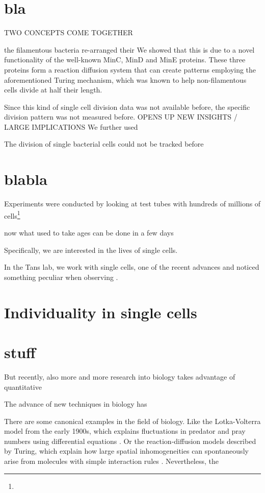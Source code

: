 \section{bla}

TWO CONCEPTS COME TOGETHER

the filamentous bacteria re-arranged their 
%
We showed that this is due to a novel functionality of the well-known MinC, MinD and MinE proteins.
These three proteins form a reaction diffusion system that can create patterns employing the aforementioned Turing mechanism, 
which was known to help non-filamentous cells divide at half their length. 
%

%
Since this kind of single cell division data was not available before, the specific division pattern was not measured before.
OPENS UP NEW INSIGHTS / LARGE IMPLICATIONS
%
We further used 



The division of single bacterial cells could not be tracked before 



\section{blabla}

Experiments were conducted by looking at test tubes with hundreds of millions of cells\footnote{} 

now
what used to take ages
can be done in a few days


Specifically, we are interested in the lives of single cells.
%

%
%


In the Tans lab, we work with single cells, one of the recent advances 
%
and noticed something peculiar when observing .

\section{Individuality in single cells}



\section*{stuff}
But recently, also more and more research into biology takes advantage of quantitative 


The advance of new techniques in biology has 


There are some canonical examples in the field of biology.
%
Like the Lotka-Volterra model from the early 1900s, which explains fluctuations in predator and pray numbers using differential equations \cite{Lotka1920,Volterra1928}.
Or the reaction-diffusion models described by Turing, which explain how large spatial inhomogeneities can spontaneously arise from molecules with simple interaction rules \cite{Turing1952}.
%
Nevertheless, the 

